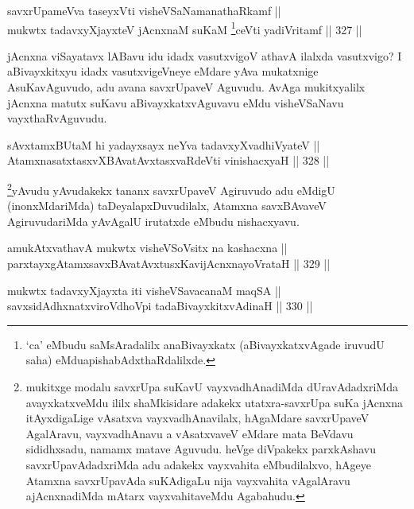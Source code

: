 \begin{shl}
savxrUpameVva taseyxVti visheVSaNamanathaRkamf || \\
mukwtx tadavxyXjayxteV jAcnxnaM suKaM \footnote{`ca' eMbudu saMsAradalilx anaBivayxkatx (aBivayxkatxvAgade iruvudU saha) eMdu\break apishabAdxthaRdalilxde.}ceVti yadiVritamf \hfill || 327 ||  
\end{shl}


\begin{artha}
jAcnxna viSayatavx lABavu idu idadx vasutxvigoV athavA
ilalxda vasutxvigo? I aBivayxkitxyu idadx vasutxvigeVneye eMdare yAva
mukatxnige AsuKavAguvudo, adu avana savxrUpaveV Aguvudu. AvAga
mukitxyalilx jAcnxna matutx suKavu aBivayxkatxvAguvavu eMdu
visheVSaNavu vayxthaRvAguvudu.
\end{artha}

\begin{shl}
sAvxtamxBUtaM hi yadayxsayx neYva tadavxyXvadhiVyateV || \\
AtamxnasatxtasxvXBAvatAvxtasxvaRdeVti vinishacxyaH \hfill || 328 ||  
\end{shl}

\begin{artha}
\footnote{mukitxge modalu savxrUpa suKavU vayxvadhAnadiMda
dUravAdadxriMda avayxkatxveMdu ililx shaMkisidare adakekx
utatxra-savxrUpa suKa jAcnxna itAyxdigaLige vAsatxva
vayxvadhAnavilalx, hAgaMdare savxrUpaveV AgalAravu, vayxvadhAnavu a
vAsatxvaveV eMdare mata BeVdavu sididhxsadu, namamx matave Aguvudu. heVge diVpakekx parxkAshavu savxrUpavAdadxriMda adu adakekx vayxvahita eMbudilalxvo, hAgeye Atamxna savxrUpavAda suKAdigaLu nija vayxvahita vAgalAravu ajAcnxnadiMda mAtarx vayxvahitaveMdu Agabahudu.}yAvudu yAvudakekx tananx savxrUpaveV Agiruvudo adu eMdigU
(inonxMdariMda) taDeyalapxDuvudilalx, Atamxna savxBAvaveV
AgiruvudariMda yAvAgalU irutatxde eMbudu nishacxyavu.
\end{artha}


\begin{shl}
amukAtxvathavA mukwtx visheVSoV\s sitx na kashacxna || \\
parxtayxgAtamxsavxBAvatAvxtusxKavijAcnxnayoVrataH \hfill || 329 ||  
\end{shl}

\begin{shl}
mukwtx tadavxyXjayxta iti visheVSavacanaM maqSA || \\
savxsidAdhxnatxviroVdhoV\s pi tadaBivayxkitxvAdinaH \hfill || 330 ||  
\end{shl}

